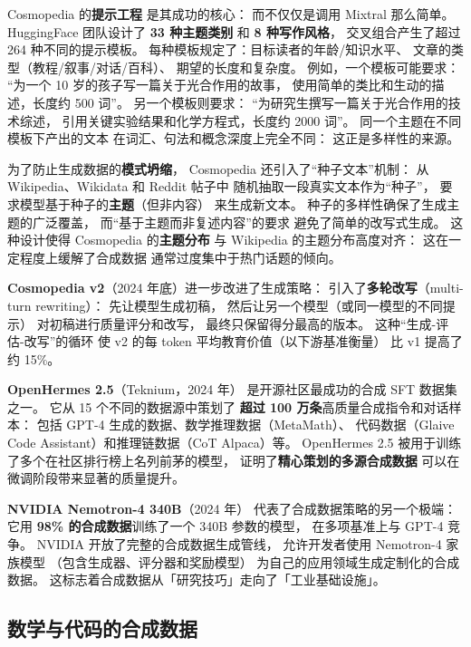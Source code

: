 Cosmopedia 的\textbf{提示工程}
是其成功的核心：
而不仅仅是调用 Mixtral 那么简单。
HuggingFace 团队设计了 \textbf{33 种主题类别}
和 \textbf{8 种写作风格}，
交叉组合产生了超过 264 种不同的提示模板。
每种模板规定了：目标读者的年龄/知识水平、
文章的类型（教程/叙事/对话/百科）、
期望的长度和复杂度。
例如，一个模板可能要求：
“为一个 10 岁的孩子写一篇关于光合作用的故事，
使用简单的类比和生动的描述，长度约 500 词”。
另一个模板则要求：
“为研究生撰写一篇关于光合作用的技术综述，
引用关键实验结果和化学方程式，长度约 2000 词”。
同一个主题在不同模板下产出的文本
在词汇、句法和概念深度上完全不同：
这正是多样性的来源。

为了防止生成数据的\textbf{模式坍缩}，
Cosmopedia 还引入了“种子文本”机制：
从 Wikipedia、Wikidata 和 Reddit 帖子中
随机抽取一段真实文本作为“种子”，
要求模型基于种子的\textbf{主题}（但非内容）
来生成新文本。
种子的多样性确保了生成主题的广泛覆盖，
而“基于主题而非复述内容”的要求
避免了简单的改写式生成。
这种设计使得 Cosmopedia 的\textbf{主题分布}
与 Wikipedia 的主题分布高度对齐：
这在一定程度上缓解了合成数据
通常过度集中于热门话题的倾向。

\textbf{Cosmopedia v2}（2024 年底）进一步改进了生成策略：
引入了\textbf{多轮改写}（multi-turn rewriting）：
先让模型生成初稿，
然后让另一个模型（或同一模型的不同提示）
对初稿进行质量评分和改写，
最终只保留得分最高的版本。
这种“生成-评估-改写”的循环
使 v2 的每 token 平均教育价值（以下游基准衡量）
比 v1 提高了约 15\%。

\textbf{OpenHermes 2.5}（Teknium，2024 年）
是开源社区最成功的合成 SFT 数据集之一。
它从 15 个不同的数据源中策划了
\textbf{超过 100 万条}高质量合成指令和对话样本：
包括 GPT-4 生成的数据、数学推理数据（MetaMath）、
代码数据（Glaive Code Assistant）和推理链数据（CoT Alpaca）等。
OpenHermes 2.5 被用于训练了多个在社区排行榜上名列前茅的模型，
证明了\textbf{精心策划的多源合成数据}
可以在微调阶段带来显著的质量提升。

\textbf{NVIDIA Nemotron-4 340B}（2024 年）
代表了合成数据策略的另一个极端：
它用 \textbf{98\% 的合成数据}训练了一个 340B 参数的模型，
在多项基准上与 GPT-4 竞争。
NVIDIA 开放了完整的合成数据生成管线，
允许开发者使用 Nemotron-4 家族模型
（包含生成器、评分器和奖励模型）
为自己的应用领域生成定制化的合成数据。
这标志着合成数据从「研究技巧」走向了「工业基础设施」。

\subsection{数学与代码的合成数据}

